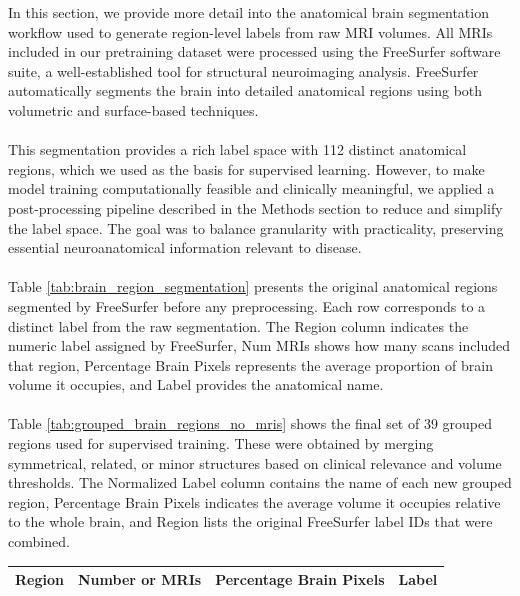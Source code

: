 \documentclass[pdflatex,sn-nature]{sn-jnl}%
\newif\ifhighlight
\newcommand{\rev}[1]{\ifhighlight{\color{blue}{}#1}\else#1\fi}%
\newcommand{\revdel}[1]{\ifhighlight{\color{red}\sout{#1}}\fi}
\theoremstyle{thmstyleone}%
\theoremstyle{thmstyletwo}%
\theoremstyle{thmstylethree}%
\begin{document}
\begin{appendices}
In this section, we provide more detail into the anatomical brain segmentation workflow used to generate region-level labels from raw MRI volumes. All MRIs included in our pretraining dataset were processed using the FreeSurfer software suite, a well-established tool for structural neuroimaging analysis. FreeSurfer automatically segments the brain into detailed anatomical regions using both volumetric and surface-based techniques.\\
\\
This segmentation provides a rich label space with 112 distinct anatomical regions, which we used as the basis for supervised learning. However, to make model training computationally feasible and clinically meaningful, we applied a post-processing pipeline described in the Methods section to reduce and simplify the label space. The goal was to balance granularity with practicality, preserving essential neuroanatomical information relevant to disease. \\
\\
\revdel{Appendix} Table \ref{tab:brain_region_segmentation} presents the original anatomical regions segmented by FreeSurfer before any preprocessing. Each row corresponds to a distinct label from the raw segmentation. The Region column indicates the numeric label assigned by FreeSurfer, Num MRIs shows how many scans included that region, Percentage Brain Pixels represents the average proportion of brain volume it occupies, and Label provides the anatomical name.\\
\\
\revdel{Appendix} Table \ref{tab:grouped_brain_regions_no_mris} shows the final set of 39 grouped regions used for supervised training. These were obtained by merging symmetrical, related, or minor structures based on clinical relevance and volume thresholds. The Normalized Label column contains the name of each new grouped region, Percentage Brain Pixels indicates the average volume it occupies relative to the whole brain, and Region lists the original FreeSurfer label IDs that were combined. \\


\begin{small}
\begin{longtable}{r|r|r|l}

\toprule
 \textbf{Region} &  \textbf{Number or MRIs} &  \textbf{Percentage Brain Pixels} &                          \textbf{ Label} \\
\midrule
\endfirsthead


\end{longtable}
\end{small}
\end{appendices}
\end{document}

